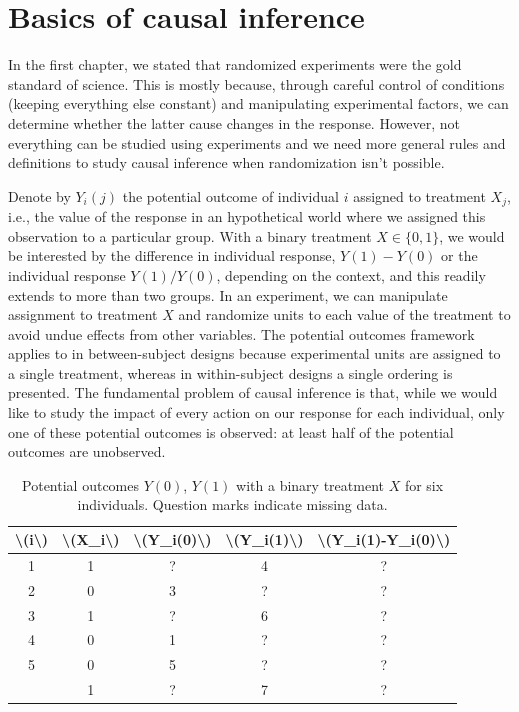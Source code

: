 \documentclass[
  11pt,
  letterpaper,
]{scrbook}
\theoremstyle{definition}
\theoremstyle{definition}
\theoremstyle{remark}
\begin{document}
\section{Basics of causal inference}\label{basics-of-causal-inference}

In the first chapter, we stated that randomized experiments were the
gold standard of science. This is mostly because, through careful
control of conditions (keeping everything else constant) and
manipulating experimental factors, we can determine whether the latter
cause changes in the response. However, not everything can be studied
using experiments and we need more general rules and definitions to
study causal inference when randomization isn't possible.

Denote by \(Y_i(j)\) the potential outcome of individual \(i\) assigned
to treatment \(X_j\), i.e., the value of the response in an hypothetical
world where we assigned this observation to a particular group. With a
binary treatment \(X \in \{0,1\}\), we would be interested by the
difference in individual response, \(Y(1)-Y(0)\) or the individual
response \(Y(1)/Y(0)\), depending on the context, and this readily
extends to more than two groups. In an experiment, we can manipulate
assignment to treatment \(X\) and randomize units to each value of the
treatment to avoid undue effects from other variables. The potential
outcomes framework applies to in between-subject designs because
experimental units are assigned to a single treatment, whereas in
within-subject designs a single ordering is presented. The fundamental
problem of causal inference is that, while we would like to study the
impact of every action on our response for each individual, only one of
these potential outcomes is observed: at least half of the potential
outcomes are unobserved.

\begin{longtable}[t]{ccccc}

\caption{\label{tbl-missing}Potential outcomes \(Y(0)\), \(Y(1)\) with a
binary treatment \(X\) for six individuals. Question marks indicate
missing data.}

\tabularnewline

\toprule
\textbackslash{}(i\textbackslash{}) & \textbackslash{}(X\_i\textbackslash{}) & \textbackslash{}(Y\_i(0)\textbackslash{}) & \textbackslash{}(Y\_i(1)\textbackslash{}) & \textbackslash{}(Y\_i(1)-Y\_i(0)\textbackslash{})\\
\midrule
1 & 1 & ? & 4 & ?\\
2 & 0 & 3 & ? & ?\\
3 & 1 & ? & 6 & ?\\
4 & 0 & 1 & ? & ?\\
5 & 0 & 5 & ? & ?\\
\addlinespace
6 & 1 & ? & 7 & ?\\
\bottomrule

\end{longtable}
\end{document}
